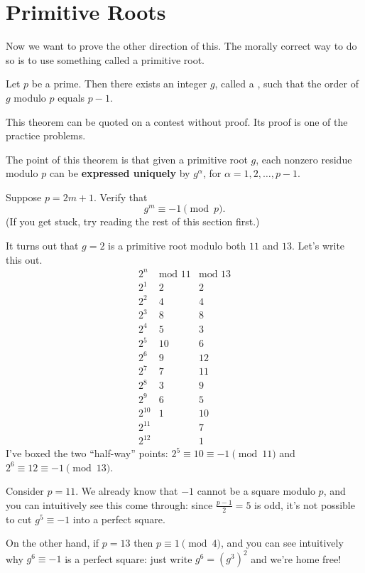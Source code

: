 \documentclass[11pt]{scrartcl}
\begin{document}
\section{Primitive Roots}
Now we want to prove the other direction of this.
The morally correct way to do so is to use something called a primitive root.

\begin{theorem}
  Let $p$ be a prime.
  Then there exists an integer $g$, called a ,
  such that the order of $g$ modulo $p$ equals $p-1$.
\end{theorem}
This theorem can be quoted on a contest without proof.
Its proof is one of the practice problems.

The point of this theorem is that given a primitive root $g$,
each nonzero residue modulo $p$ can be \textbf{expressed uniquely} by $g^\alpha$,
for $\alpha = 1, 2, \dots, p-1$.

\begin{exercise}
  Suppose $p = 2m+1$.
  Verify that \[ g^{m} \equiv -1 \pmod p. \]
  (If you get stuck, try reading the rest of this section first.)
\end{exercise}

\begin{example}
It turns out that $g=2$ is a primitive root modulo both $11$ and $13$.
Let's write this out.
\[
  \begin{array}{r|rr}
    2^n & \text{mod $11$} & \text{mod $13$} \\ \hline
    2^1 & 2 & 2 \\
    2^2 & 4 & 4 \\
    2^3 & 8 & 8 \\
    2^4 & 5 & 3 \\
    2^5 & \boxed{10} & 6 \\
    2^6 & 9 & \boxed{12} \\
    2^7 & 7 & 11 \\
    2^8 & 3 & 9 \\
    2^9 & 6 & 5 \\
    2^{10} & 1 & 10 \\
    2^{11} &   & 7 \\
    2^{12} &   & 1
  \end{array}
\]
I've boxed the two ``half-way'' points: $2^5 \equiv 10 \equiv -1 \pmod{11}$
and $2^6 \equiv 12 \equiv -1 \pmod{13}$.

Consider $p=11$.
We already know that $-1$ cannot be a square modulo $p$,
and you can intuitively see this come through: since $\frac{p-1}{2}=5$ is odd,
it's not possible to cut $g^5 \equiv -1$ into a perfect square.

On the other hand, if $p=13$ then $p \equiv 1 \pmod 4$,
and you can see intuitively why $g^6 \equiv -1$ is a perfect square:
just write $g^6 = (g^3)^2$ and we're home free!
\end{example}
\end{document}
